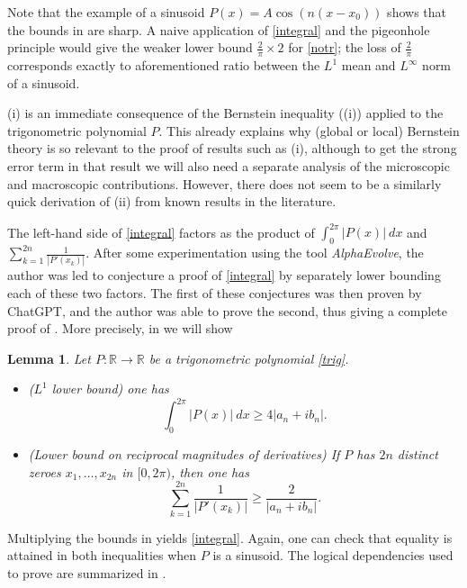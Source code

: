 \documentclass[12pt]{amsart}
\newtheorem{lemma}[theorem]{Lemma}
\newcommand{\R}{\mathbb{R}}
\begin{document}
Note that the example of a sinusoid $P(x) = A \cos(n(x-x_0))$ shows that the bounds in  are sharp.  A naive application of \eqref{integral} and the pigeonhole principle would give the weaker lower bound $\frac{2}{\pi} \times 2$ for \eqref{notr}; the loss of $\frac{2}{\pi}$ corresponds exactly to aforementioned ratio between the $L^1$ mean and $L^\infty$ norm of a sinusoid.

(i) is an immediate consequence of the Bernstein inequality ((i)) applied to the trigonometric polynomial $P$.  This already explains why (global or local) Bernstein theory is so relevant to the proof of results such as (i), although to get the strong error term in that result we will also need a separate analysis of the microscopic and macroscopic contributions.  However, there does not seem to be a similarly quick derivation of (ii) from known results in the literature.

The left-hand side of \eqref{integral} factors as the product of $\int_0^{2\pi} |P(x)|\ dx$ and $\sum_{k=1}^{2n} \frac{1}{|P'(x_k)|}$.  After some experimentation using the tool \emph{AlphaEvolve}, the author was led to conjecture a proof of  \eqref{integral} by separately lower bounding each of these two factors.  The first of these conjectures was then proven by ChatGPT, and the author was able to prove the second, thus giving a complete proof of .  More precisely, in  we will show

\begin{lemma}\label{trig-lem}  Let $P \colon \R \to \R$ be a trigonometric polynomial \eqref{trig}.
\begin{itemize}
    \item[(i)] ($L^1$ lower bound) one has
$$ \int_0^{2\pi} |P(x)|\ dx \geq 4 |a_n+ib_n|.$$
    \item[(ii)] (Lower bound on reciprocal magnitudes of derivatives)  If $P$ has $2n$ distinct zeroes $x_1,\dots,x_{2n}$ in $[0,2\pi)$, then one has
    $$ \sum_{k=1}^{2n} \frac{1}{|P'(x_k)|} \geq \frac{2}{|a_n+ib_n|}.$$
\end{itemize}
\end{lemma}

Multiplying the bounds in  yields \eqref{integral}.  Again, one can check that equality is attained in both inequalities when $P$ is a sinusoid.  The logical dependencies used to prove  are summarized in .
\end{document}
